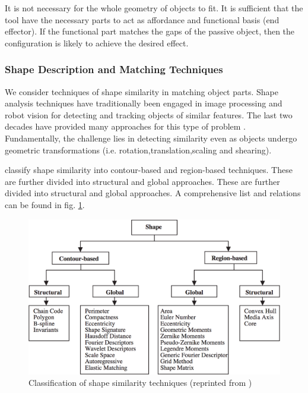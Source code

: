 \documentclass[
    floatsintext
]{article}
\begin{document}
It is not necessary for the whole geometry of objects to fit. 
It is sufficient that the tool have the necessary parts to act as affordance and functional basis (end effector\cite{zhu2015}).
If the functional part matches the gaps of the passive object, then the configuration is likely to achieve the desired effect. 

\subsubsection{Shape Description and Matching Techniques}
We consider techniques of shape similarity in matching object parts.
Shape analysis techniques have traditionally been engaged in image processing and robot vision for detecting and tracking objects of similar features.
The last two decades have provided many approaches for this type of problem \cite{loncaric1998,zhang2004,veltkamp2001,robert2012}.
Fundamentally, the challenge lies in detecting similarity even as objects undergo geometric transformations (i.e. rotation,translation,scaling and shearing).     

\cite{zhang2004} classify shape similarity into contour-based and region-based techniques. These are further divided into structural and global approaches.
These are further divided into structural and global approaches.
A comprehensive list and relations can be found in fig. \ref{fig:shape_similarity}. 

\begin{figure}[hb]
  \centering
  \includegraphics[width=1\textwidth]{./figures/similarity_techniques.png}
  \caption{Classification of shape similarity techniques (reprinted from \cite{zhang2004})}
  \label{fig:shape_similarity}
\end{figure}  
\end{document}
